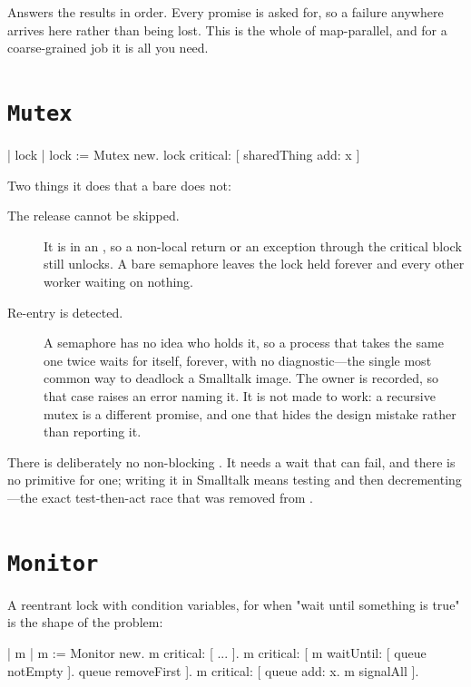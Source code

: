 Answers the results in order. Every promise is asked for, so a failure
anywhere arrives here rather than being lost. This is the whole of
map-parallel, and for a coarse-grained job it is all you need.

\section{\texttt{Mutex}}

\begin{st}
| lock |
lock := Mutex new.
lock critical: [ sharedThing add: x ]
\end{st}

Two things it does that a bare  does not:

\begin{description}
\item[The release cannot be skipped.] It is in an , so a non-local
  return or an exception through the critical block still unlocks. A bare
  semaphore leaves the lock held forever and every other worker waiting on
  nothing.
\item[Re-entry is detected.] A semaphore has no idea who holds it, so a
  process that takes the same one twice waits for itself, forever, with no
  diagnostic---the single most common way to deadlock a Smalltalk image. The
  owner is recorded, so that case raises an error naming it. It is not made to
  work: a recursive mutex is a different promise, and one that hides the design
  mistake rather than reporting it.
\end{description}

\begin{stnote}
There is deliberately no non-blocking . It needs a wait that
can fail, and there is no primitive for one; writing it in Smalltalk means
testing  and then decrementing---the exact test-then-act race
that was removed from .
\end{stnote}

\section{\texttt{Monitor}}

A reentrant lock with condition variables, for when "wait until something is
true" is the shape of the problem:

\begin{st}
| m |
m := Monitor new.
m critical: [ ... ].
m critical: [ m waitUntil: [ queue notEmpty ]. queue removeFirst ].
m critical: [ queue add: x. m signalAll ].
\end{st}

